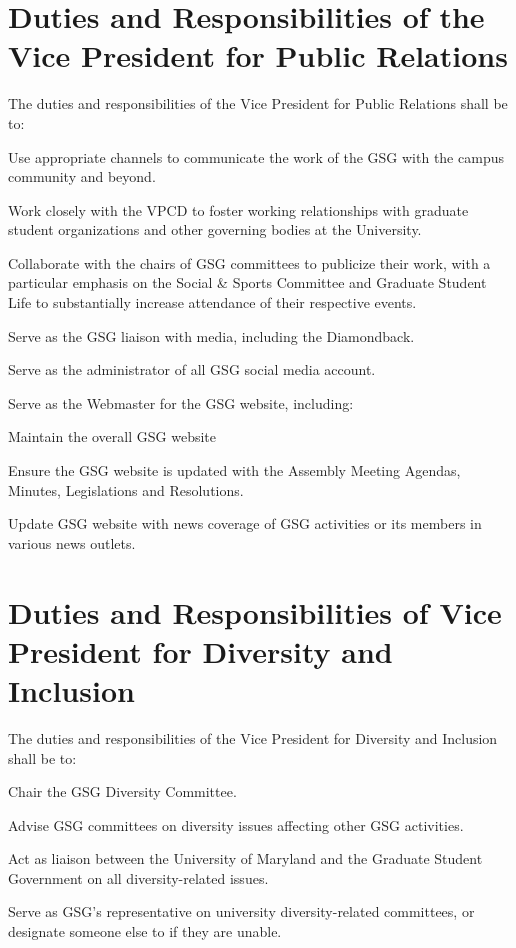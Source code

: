\section{Duties and Responsibilities of the Vice President for Public Relations}
The duties and responsibilities of the Vice President for Public Relations shall be to:
\begin{bylaws-number}
  \item Use appropriate channels to communicate the work of the GSG with the campus community and beyond.
  \item Work closely with the VPCD to foster working relationships with graduate student organizations and other governing bodies at the University.
  \item Collaborate with the chairs of GSG committees to publicize their work, with a particular emphasis on the Social \& Sports Committee and Graduate Student Life to substantially increase attendance of their respective events.
  \item Serve as the GSG liaison with media, including the Diamondback.
  \item Serve as the administrator of all GSG social media account.
  \item Serve as the Webmaster for the GSG website, including:
  \begin{bylaws-number}
  	\item Maintain the overall GSG website
  	\item Ensure the GSG website is updated with the Assembly Meeting Agendas, Minutes, Legislations and Resolutions. 
  	\item Update GSG website with news coverage of GSG activities or its members in various news outlets.
  \end{bylaws-number}
\end{bylaws-number}

\section{Duties and Responsibilities of Vice President for Diversity and Inclusion}
The duties and responsibilities of the Vice President for Diversity and Inclusion shall be to:
\begin{bylaws-number}
	\item Chair the GSG Diversity Committee.
	\item Advise GSG committees on diversity issues affecting other GSG activities.
	\item Act as liaison between the University of Maryland and the Graduate Student Government on all diversity-related issues.
	\item Serve as GSG’s representative on university diversity-related committees, or designate someone else to if they are unable.
\end{bylaws-number}

